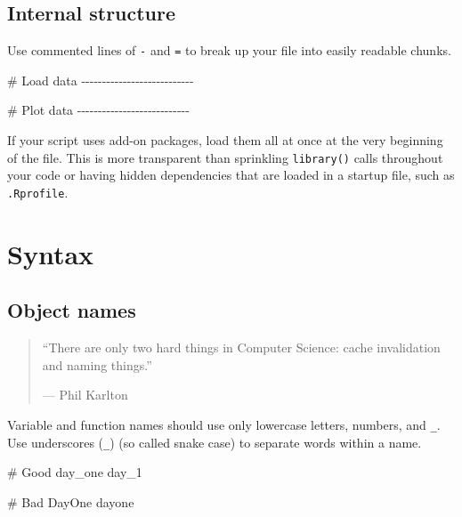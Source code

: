 \documentclass[twoside, pagesize, fontsize=11pt, dvipsnames]{scrreport} %
\newenvironment{Shaded}{\begin{snugshade}}{\end{snugshade}}
\newcommand{\CommentTok}[1]{\textcolor[rgb]{0.37,0.37,0.37}{#1}}
\newcommand{\NormalTok}[1]{\textcolor[rgb]{0.00,0.23,0.31}{#1}}
\begin{document}
\hypertarget{internal-structure}{%
\section{Internal structure}\label{internal-structure}}

Use commented lines of \texttt{-} and \texttt{=} to break up your file
into easily readable chunks.

\begin{Shaded}
\begin{Highlighting}[]
\CommentTok{\# Load data {-}{-}{-}{-}{-}{-}{-}{-}{-}{-}{-}{-}{-}{-}{-}{-}{-}{-}{-}{-}{-}{-}{-}{-}{-}{-}{-}}

\CommentTok{\# Plot data {-}{-}{-}{-}{-}{-}{-}{-}{-}{-}{-}{-}{-}{-}{-}{-}{-}{-}{-}{-}{-}{-}{-}{-}{-}{-}{-}}
\end{Highlighting}
\end{Shaded}

If your script uses add-on packages, load them all at once at the very
beginning of the file. This is more transparent than sprinkling
\texttt{library()} calls throughout your code or having hidden
dependencies that are loaded in a startup file, such as
\texttt{.Rprofile}.


\hypertarget{syntax}{%
\chapter{Syntax}\label{syntax}}

\hypertarget{object-names}{%
\section{Object names}\label{object-names}}

\begin{quote}
\enquote{There are only two hard things in Computer Science: cache
invalidation and naming things.}

--- Phil Karlton
\end{quote}

Variable and function names should use only lowercase letters, numbers,
and \texttt{\_}. Use underscores (\texttt{\_}) (so called snake case) to
separate words within a name.

\begin{Shaded}
\begin{Highlighting}[]
\CommentTok{\# Good}
\NormalTok{day\_one}
\NormalTok{day\_1}

\CommentTok{\# Bad}
\NormalTok{DayOne}
\NormalTok{dayone}
\end{Highlighting}
\end{Shaded}
\end{document}
